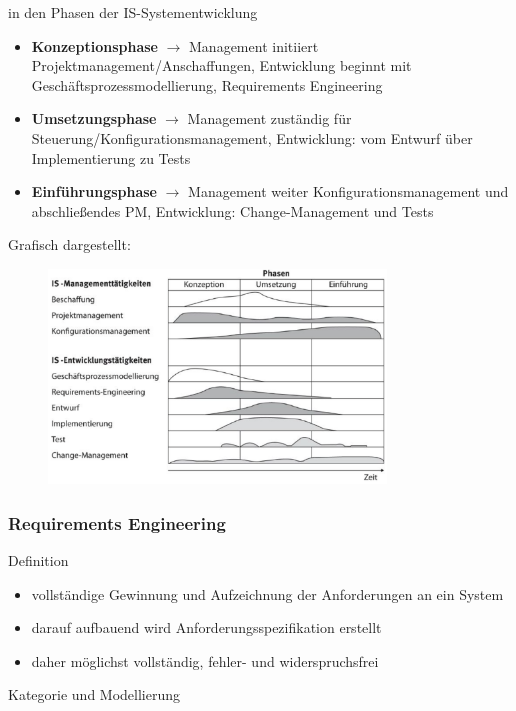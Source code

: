 in den Phasen der IS-Systementwicklung

\begin{itemize}
  \item \textbf{Konzeptionsphase} $\rightarrow$ Management initiiert Projektmanagement/Anschaffungen, Entwicklung beginnt mit Geschäftsprozessmodellierung, Requirements Engineering
  \item \textbf{Umsetzungsphase} $\rightarrow$ Management zuständig für Steuerung/Konfigurationsmanagement, Entwicklung: vom Entwurf über Implementierung zu Tests
  \item \textbf{Einführungsphase} $\rightarrow$ Management weiter Konfigurationsmanagement und abschließendes PM, Entwicklung: Change-Management und Tests
  \end{itemize}
  
Grafisch dargestellt:

\begin{figure}[h]
\centering
\includegraphics[width=0.8\textwidth]{assets/Phasen_Systementwicklung.png}
\end{figure}

\subsubsection{Requirements Engineering}
Definition

\begin{itemize}
  \item vollständige Gewinnung und Aufzeichnung der Anforderungen an ein System
  \item darauf aufbauend wird Anforderungsspezifikation erstellt
  \item daher möglichst vollständig, fehler- und widerspruchsfrei
\end{itemize}

Kategorie und Modellierung

